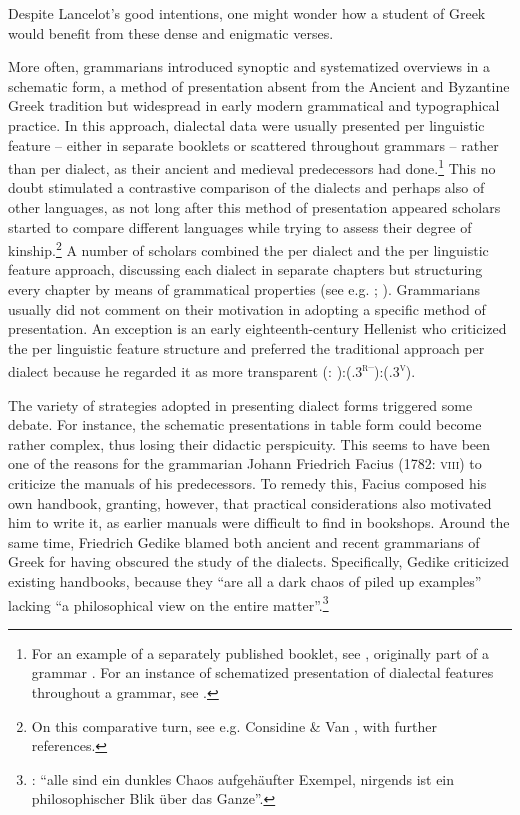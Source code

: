 Despite Lancelot’s good intentions, one might wonder how a student of Greek would benefit from these dense and enigmatic verses.

More often, grammarians introduced synoptic and systematized overviews in a schematic form, a method of presentation absent from the Ancient and Byzantine Greek tradition but widespread in early modern grammatical and typographical practice. In this approach, dialectal data were usually presented per linguistic feature – either in separate booklets or scattered throughout grammars – rather than per dialect, as their ancient and medieval predecessors had done.\footnote{For an example of a separately published booklet, see \citet{Amerot1530}, originally part of a grammar \citep{Amerot1520}. For an instance of schematized presentation of dialectal features throughout a grammar, see \citet{Gretser1593}.} This no doubt stimulated a contrastive comparison of the dialects and perhaps also of other languages, as not long after this method of presentation appeared scholars started to compare different languages while trying to assess their degree of kinship.\footnote{On this comparative turn, see e.g. Considine \& Van \citet{Hal2010}, with further references.} A number of scholars combined the per dialect and the per linguistic feature approach, discussing each dialect in separate chapters but structuring every chapter by means of grammatical properties (see e.g. \citealt{Zwinger1605}; \citealt{Mérigon1621}). Grammarians usually did not comment on their motivation in adopting a specific method of presentation. An exception is an early eighteenth-century Hellenist who criticized the per linguistic feature structure and preferred the traditional approach per dialect because he regarded it as more transparent (\citealt{Heupel1712}: ):(.3\textsc{\textsuperscript{r–}}):(.3\textsc{\textsuperscript{v}}).

The variety of strategies adopted in presenting dialect forms triggered some debate. For instance, the schematic presentations in table form could become rather complex, thus losing their didactic perspicuity. This seems to have been one of the reasons for the grammarian Johann Friedrich Facius (1782: \textsc{viii}) to criticize the manuals of his predecessors. To remedy this, Facius composed his own handbook, granting, however, that practical considerations also motivated him to write it, as earlier manuals were difficult to find in bookshops. Around the same time, Friedrich Gedike blamed both ancient and recent grammarians of Greek for having obscured the study of the dialects. Specifically, Gedike criticized existing handbooks, because they “are all a dark chaos of piled up examples” lacking “a philosophical view on the entire matter”.\footnote{\citet[4]{Gedike1782}: “alle sind ein dunkles Chaos aufgehäufter Exempel, nirgends ist ein philosophischer Blik über das Ganze”.}

